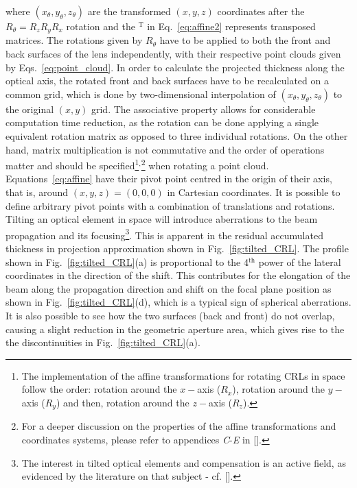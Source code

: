 \begin{refsection}
where $(x_\theta,y_\theta,z_\theta)$ are the transformed $(x,y,z)$ coordinates after the $R_{\theta}=R_zR_yR_x$ rotation and the $^\text{T}$ in Eq.~\ref{eq:affine2} represents transposed matrices. The rotations given by $R_{\theta}$ have to be applied to both the front and back surfaces of the lens independently, with their respective point clouds given by Eqs.~\ref{eq:point_cloud}. In order to calculate the projected thickness along the optical axis, the rotated front and back surfaces have to be recalculated on a common grid, which is done by two-dimensional interpolation of $(x_\theta,y_\theta,z_\theta)$ to the original $(x,y)$ grid. The associative property allows for considerable computation time reduction, as the rotation can be done applying a single equivalent rotation matrix as opposed to three individual rotations. On the other hand, matrix multiplication is not commutative and the order of operations matter and should be specified\footnote{The implementation of the affine transformations for rotating CRLs in space follow the order: rotation around the $x-$axis ($R_x$), rotation around the $y-$axis ($R_y$) and then, rotation around the $z-$axis ($R_z$).}$^{,}$\footnote{For a deeper discussion on the properties of the affine transformations and coordinates systems, please refer to appendices \textit{C}-\textit{E} in [\cite{House2016}].} when rotating a point cloud. Equations~\ref{eq:affine} have their pivot point centred in the origin of their axis, that is, around $(x,y,z)=(0,0,0)$ in Cartesian coordinates. It is possible to define arbitrary pivot points with a combination of translations and rotations. Tilting an optical element in space will introduce aberrations to the beam propagation and its focusing\footnote{The interest in tilted optical elements and compensation is an active field, as evidenced by the literature on that subject - cf. [\cite{Guizar-Sicairos2011,Zhou2019,Ali2020}].}. This is apparent in the residual accumulated thickness in projection approximation shown in Fig.~\ref{fig:tilted_CRL}. The profile shown in Fig.~\ref{fig:tilted_CRL}(a) is proportional to the 4$^{\text{th}}$ power of the lateral coordinates in the direction of the shift. This contributes for the elongation of the beam along the propagation direction and shift on the focal plane position as shown in Fig.~\ref{fig:tilted_CRL}(d), which is a typical sign of spherical aberrations. It is also possible to see how the two surfaces (back and front) do not overlap, causing a slight reduction in the geometric aperture area, which gives rise to the the discontinuities in Fig.~\ref{fig:tilted_CRL}(a).


\end{refsection}
